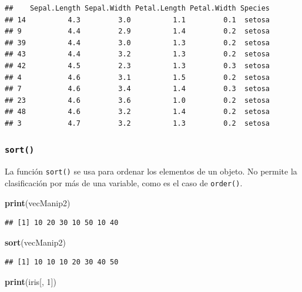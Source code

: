 \documentclass[
]{book}
\newenvironment{Shaded}{\begin{snugshade}}{\end{snugshade}}
\newcommand{\DecValTok}[1]{\textcolor[rgb]{0.00,0.00,0.81}{#1}}
\newcommand{\KeywordTok}[1]{\textcolor[rgb]{0.13,0.29,0.53}{\textbf{#1}}}
\newcommand{\NormalTok}[1]{#1}
\begin{document}
\begin{verbatim}
##    Sepal.Length Sepal.Width Petal.Length Petal.Width Species
## 14          4.3         3.0          1.1         0.1  setosa
## 9           4.4         2.9          1.4         0.2  setosa
## 39          4.4         3.0          1.3         0.2  setosa
## 43          4.4         3.2          1.3         0.2  setosa
## 42          4.5         2.3          1.3         0.3  setosa
## 4           4.6         3.1          1.5         0.2  setosa
## 7           4.6         3.4          1.4         0.3  setosa
## 23          4.6         3.6          1.0         0.2  setosa
## 48          4.6         3.2          1.4         0.2  setosa
## 3           4.7         3.2          1.3         0.2  setosa
\end{verbatim}

\hypertarget{l015sort}{%
\subsubsection{\texorpdfstring{\texttt{sort()}}{sort()}}\label{l015sort}}

La función \texttt{sort()} se usa para ordenar los elementos de un objeto. No permite la clasificación por más de una variable, como es el caso de \texttt{order()}.

\begin{Shaded}
\begin{Highlighting}[]
\KeywordTok{print}\NormalTok{(vecManip2)}
\end{Highlighting}
\end{Shaded}

\begin{verbatim}
## [1] 10 20 30 10 50 10 40
\end{verbatim}

\begin{Shaded}
\begin{Highlighting}[]
\KeywordTok{sort}\NormalTok{(vecManip2)}
\end{Highlighting}
\end{Shaded}

\begin{verbatim}
## [1] 10 10 10 20 30 40 50
\end{verbatim}

\begin{Shaded}
\begin{Highlighting}[]
\KeywordTok{print}\NormalTok{(iris[, }\DecValTok{1}\NormalTok{])}
\end{Highlighting}
\end{Shaded}
\end{document}
